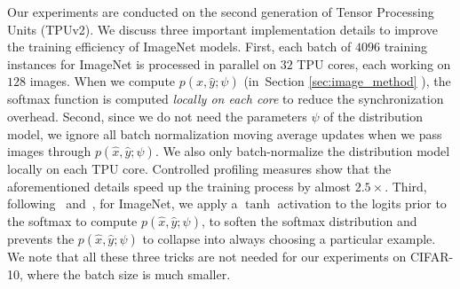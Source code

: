 Our experiments are conducted on the second generation of Tensor Processing Units (TPUv2). We discuss three important implementation details to improve the training efficiency of ImageNet models. First, each batch of $4096$ training instances for ImageNet is processed in parallel on $32$ TPU cores, each working on $128$ images. When we compute $p(\hat{x}, \hat{y}; \psi)$ (in~Section \ref{sec:image_method} ), the softmax function is computed \textit{locally on each core} to reduce the synchronization overhead. Second, since we do not need the parameters $\psi$ of the distribution model, we ignore all batch normalization moving average updates when we pass images through $p(\hat{x}, \hat{y}; \psi)$. We also only batch-normalize the distribution model locally on each TPU core. Controlled profiling measures show that the aforementioned details speed up the training process by almost $2.5 \times$. Third, following~\citet{neural_combi} and~\citet{enas}, for ImageNet, we apply a $\tanh$ activation to the logits prior to the softmax to compute $p(\hat{x}, \hat{y}; \psi)$, to soften the softmax distribution and prevents the $p(\hat{x}, \hat{y}; \psi)$ to collapse into always choosing a particular example. We note that all these three tricks are not needed for our experiments on CIFAR-10, where the batch size is much smaller.

